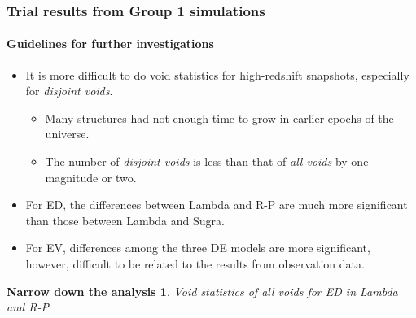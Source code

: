 \documentclass{beamer}
\newtheorem{Narrow down the analysis}{Narrow down the analysis}
\begin{document}
\begin{frame}
	\frametitle{Trial results from Group 1 simulations}
	\framesubtitle{Guidelines for further investigations}
	\begin{itemize}
	\pause\item It is more difficult to do void statistics for high-redshift snapshots, especially for \textit{disjoint voids}.
		\begin{itemize}
		\pause \item Many structures had not enough time to grow in earlier epochs of the universe.
		\item The number of \textit{disjoint voids} is less than that of \textit{all voids} by one magnitude or two.
		\end{itemize}
	\pause \item For ED, the differences between Lambda and R-P are much more significant than those between Lambda and Sugra.
	\pause \item For EV, differences among the three DE models are more significant, however, difficult to be related to the results from observation data.\\
	\end{itemize}
	\pause
	\begin{Narrow down the analysis} %
         Void statistics of \textit{all voids} for ED in Lambda and R-P 
    \end{Narrow down the analysis}
\end{frame}
\end{document}
